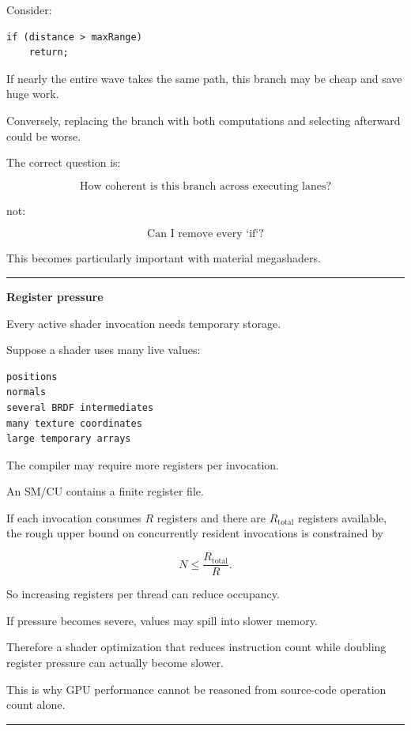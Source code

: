 Consider:

\begin{verbatim}
if (distance > maxRange)
    return;
\end{verbatim}

If nearly the entire wave takes the same path, this branch may be cheap and save huge work.

Conversely, replacing the branch with both computations and selecting afterward could be worse.

The correct question is:

\[
\text{How coherent is this branch across executing lanes?}
\]

not:

\[
\text{Can I remove every `if`?}
\]

This becomes particularly important with material megashaders.

\begin{center}\rule{0.5\linewidth}{0.5pt}\end{center}

\textbf{Register pressure}

Every active shader invocation needs temporary storage.

Suppose a shader uses many live values:

\begin{verbatim}
positions
normals
several BRDF intermediates
many texture coordinates
large temporary arrays
\end{verbatim}

The compiler may require more registers per invocation.

An SM/CU contains a finite register file.

If each invocation consumes \(R\) registers and there are \(R_{\text{total}}\) registers available, the rough upper bound on concurrently resident invocations is constrained by

\[
N
\le
\frac{R_{\text{total}}}{R}.
\]

So increasing registers per thread can reduce occupancy.

If pressure becomes severe, values may spill into slower memory.

Therefore a shader optimization that reduces instruction count while doubling register pressure can actually become slower.

This is why GPU performance cannot be reasoned from source-code operation count alone.

\begin{center}\rule{0.5\linewidth}{0.5pt}\end{center}

